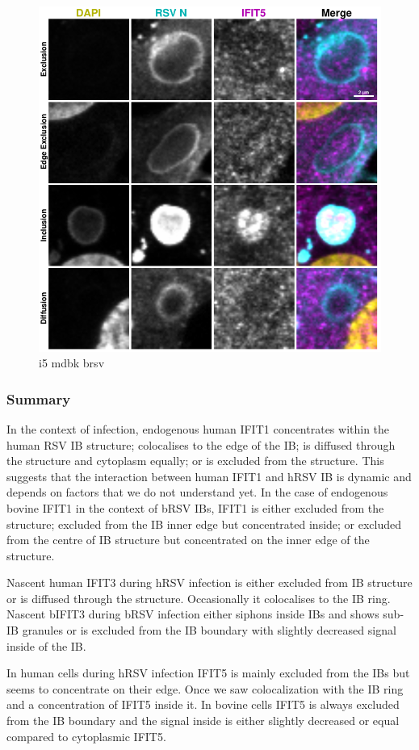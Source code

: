 \begin{figure}
    \centering
    \includegraphics[width=1\linewidth]{09. Chapter 4/Figs/02. Infection/03. IFIT5/09. mdbk i5.pdf}
    \caption[i5 mdbk brsv]{i5 mdbk brsv}
    \label{fig:i5 mdbk brsv}
\end{figure}

\subsubsection{Summary} \label{Summary-infection}
In the context of infection, endogenous human IFIT1 concentrates within the human RSV IB structure; colocalises to the edge of the IB; is diffused through the structure and cytoplasm equally; or is excluded from the structure. This suggests that the interaction between human IFIT1 and hRSV IB is dynamic and depends on factors that we do not understand yet. In the case of endogenous bovine IFIT1 in the context of bRSV IBs, IFIT1 is either excluded from the structure; excluded from the IB inner edge but concentrated inside; or excluded from the centre of IB structure but concentrated on the inner edge of the structure. 

Nascent human IFIT3 during hRSV infection is either excluded from IB structure or is diffused through the structure. Occasionally it colocalises to the IB ring. Nascent bIFIT3 during bRSV infection either siphons inside IBs and shows sub-IB granules or is excluded from the IB boundary with slightly decreased signal inside of the IB.

In human cells during hRSV infection IFIT5 is mainly excluded from the IBs but seems to concentrate on their edge. Once we saw colocalization with the IB ring and a concentration of IFIT5 inside it. In bovine cells IFIT5 is always excluded from the IB boundary and the signal inside is either slightly decreased or equal compared to cytoplasmic IFIT5. 
